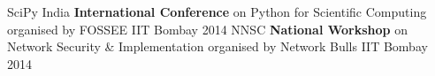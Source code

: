 \begin{cvhonors}
  \cvhonor
    {SciPy India}
    {\textbf{International Conference} on Python for Scientific Computing organised by FOSSEE}
    {IIT Bombay}
    {2014}
  \cvhonor
    {NNSC}
    { \textbf{National Workshop} on Network Security \& Implementation organised by Network Bulls}
    {IIT Bombay}
    {2014}
\end{cvhonors}